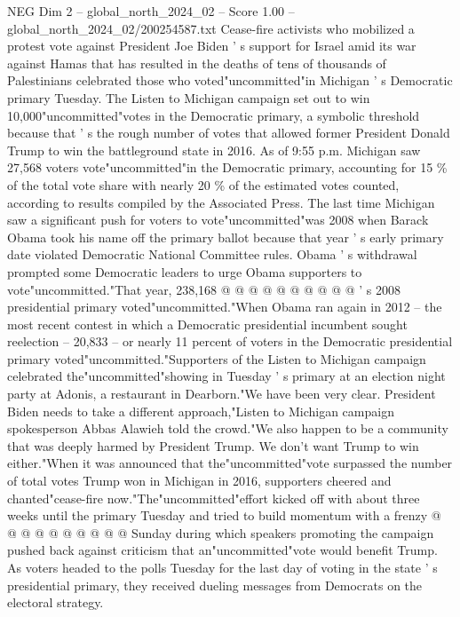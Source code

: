 \begin{textsample}{NEG Dim 2 – global\_north\_2024\_02 – Score 1.00 – global\_north\_2024\_02/200254587.txt}  \label{ex:f2_neg_302}
Cease-fire activists who mobilized a protest vote against President Joe Biden ' s support for Israel amid its war against Hamas that has resulted in the deaths of tens of thousands of Palestinians celebrated those who voted"uncommitted"in Michigan ' s Democratic primary Tuesday.
The Listen to Michigan campaign set out to win 10,000"uncommitted"votes in the Democratic primary, a symbolic threshold because that ' s the rough number of votes that allowed former President Donald Trump to win the battleground state in 2016.
As of 9:55 p.m.
Michigan saw 27,568 voters vote"uncommitted"in the Democratic primary, accounting for 15 \% of the total vote share with nearly 20 \% of the estimated votes counted, according to results compiled by the Associated Press.
The last time Michigan saw a significant push for voters to vote"uncommitted"was 2008 when Barack Obama took his name off the primary ballot because that year ' s early primary date violated Democratic National Committee rules.
Obama ' s withdrawal prompted some Democratic leaders to urge Obama supporters to vote"uncommitted."That year, 238,168 @ @ @ @ @ @ @ @ @ @ ' s 2008 presidential primary voted"uncommitted."When Obama ran again in 2012 -- the most recent contest in which a Democratic presidential incumbent sought reelection -- 20,833 -- or nearly 11 percent of voters in the Democratic presidential primary voted"uncommitted."Supporters of the Listen to Michigan campaign celebrated the"uncommitted"showing in Tuesday ' s primary at an election night party at Adonis, a restaurant in Dearborn."We have been very clear.
President Biden needs to take a different approach,"Listen to Michigan campaign spokesperson Abbas Alawieh told the crowd."We also happen to be a community that was deeply harmed by President Trump.
We don't want Trump to win either."When it was announced that the"uncommitted"vote surpassed the number of total votes Trump won in Michigan in 2016, supporters cheered and chanted"cease-fire now."The"uncommitted"effort kicked off with about three weeks until the primary Tuesday and tried to build momentum with a frenzy @ @ @ @ @ @ @ @ @ @ Sunday during which speakers promoting the campaign pushed back against criticism that an"uncommitted"vote would benefit Trump.
As voters headed to the polls Tuesday for the last day of voting in the state ' s presidential primary, they received dueling messages from Democrats on the electoral strategy.

\end{textsample}
